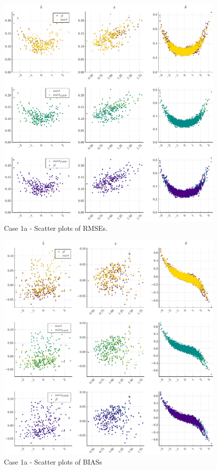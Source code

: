 \begin{figure}[H] 
	\centering
	\includegraphics[width=\textwidth]{Figures/1a/RMSEscatter.pdf}
	\caption{Case 1a - Scatter plots of RMSEs.}
	\label{fig:spRMSE1a}
\end{figure}
\begin{figure}[H] 
	\centering
	\includegraphics[width=\textwidth]{Figures/1a/BIASscatter.pdf}
	\caption{Case 1a - Scatter plots of BIASs }
	\label{fig:spBIAS1a}
\end{figure}
